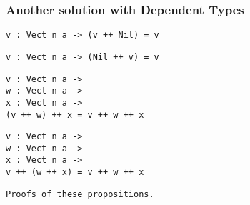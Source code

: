 \begin{frame}[fragile]
\frametitle{Another solution with Dependent Types}

\begin{lstlisting}[frame=single]
v : Vect n a -> (v ++ Nil) = v
\end{lstlisting}

\begin{lstlisting}[frame=single]
v : Vect n a -> (Nil ++ v) = v
\end{lstlisting}

\begin{lstlisting}[frame=single]
v : Vect n a ->
w : Vect n a ->
x : Vect n a ->
(v ++ w) ++ x = v ++ w ++ x
\end{lstlisting}

\begin{lstlisting}[frame=single]
v : Vect n a ->
w : Vect n a ->
x : Vect n a ->
v ++ (w ++ x) = v ++ w ++ x
\end{lstlisting}

\begin{lstlisting}[frame=single]
Proofs of these propositions.
\end{lstlisting}

\end{frame}
